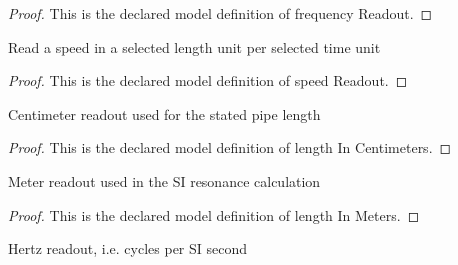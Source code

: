 \begin{proof}
  This is the declared model definition of frequency Readout.
\end{proof}
\begin{definition}
  \label{def:physics:phyx-mini-0318:phyxminiproblems-problemphyxmini0318-speedreadout}
  Read a speed in a selected length unit per selected time unit
\end{definition}
\begin{proof}
  This is the declared model definition of speed Readout.
\end{proof}
\begin{definition}
  \label{def:physics:phyx-mini-0318:phyxminiproblems-problemphyxmini0318-lengthincentimeters}
  Centimeter readout used for the stated pipe length
\end{definition}
\begin{proof}
  This is the declared model definition of length In Centimeters.
\end{proof}
\begin{definition}
  \label{def:physics:phyx-mini-0318:phyxminiproblems-problemphyxmini0318-lengthinmeters}
  Meter readout used in the SI resonance calculation
\end{definition}
\begin{proof}
  This is the declared model definition of length In Meters.
\end{proof}
\begin{definition}
  \label{def:physics:phyx-mini-0318:phyxminiproblems-problemphyxmini0318-frequencyinhertz}
  Hertz readout, i.e. cycles per SI second
\end{definition}

